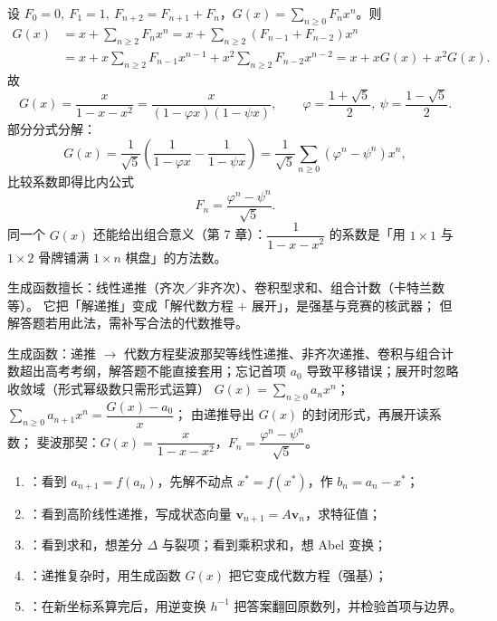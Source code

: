 \begin{explore}
设 $F_0=0,\ F_1=1,\ F_{n+2}=F_{n+1}+F_n$，$G(x)=\sum_{n\ge0}F_nx^n$。则
\[
\begin{aligned}
  G(x)&=x+\sum_{n\ge2}F_nx^n
  =x+\sum_{n\ge2}(F_{n-1}+F_{n-2})x^n\\
  &=x+x\sum_{n\ge2}F_{n-1}x^{n-1}+x^2\sum_{n\ge2}F_{n-2}x^{n-2}
  =x+xG(x)+x^2G(x) .
\end{aligned}
\]
故
\[
  G(x)=\frac{x}{1-x-x^2}
  =\frac{x}{(1-\varphi x)(1-\psi x)},\qquad
  \varphi=\frac{1+\sqrt5}{2},\ \psi=\frac{1-\sqrt5}{2} .
\]
部分分式分解：
\[
  G(x)=\frac1{\sqrt5}\left(\frac1{1-\varphi x}-\frac1{1-\psi x}\right)
  =\frac1{\sqrt5}\sum_{n\ge0}(\varphi^n-\psi^n)x^n ,
\]
比较系数即得比内公式
\[
  F_n=\frac{\varphi^n-\psi^n}{\sqrt5} .
\]
同一个 $G(x)$ 还能给出组合意义（第 7 章）：$\dfrac1{1-x-x^2}$ 的系数是「用 $1\times1$ 与 $1\times2$ 骨牌铺满 $1\times n$ 棋盘」的方法数。

生成函数擅长：线性递推（齐次／非齐次）、卷积型求和、组合计数（卡特兰数等）。
它把「解递推」变成「解代数方程 $+$ 展开」，是强基与竞赛的核武器；
但解答题若用此法，需补写合法的代数推导。

\begin{conccard}[三级]{生成函数：递推 $\to$ 代数方程}{斐波那契等线性递推、非齐次递推、卷积与组合计数}{超出高考考纲，解答题不能直接套用；忘记首项 $a_0$ 导致平移错误；展开时忽略收敛域（形式幂级数只需形式运算）}
$G(x)=\sum_{n\ge0}a_nx^n$；$\sum_{n\ge0}a_{n+1}x^n=\dfrac{G(x)-a_0}{x}$；
由递推导出 $G(x)$ 的封闭形式，再展开读系数；
斐波那契：$G(x)=\dfrac{x}{1-x-x^2}$，$F_n=\dfrac{\varphi^n-\psi^n}{\sqrt5}$。
\end{conccard}

\begin{method}
\begin{enumerate}
  \item {}：看到 $a_{n+1}=f(a_n)$，先解不动点 $x^*=f(x^*)$，作 $b_n=a_n-x^*$；
  \item {}：看到高阶线性递推，写成状态向量 $\mathbf v_{n+1}=A\mathbf v_n$，求特征值；
  \item {}：看到求和，想差分 $\Delta$ 与裂项；看到乘积求和，想 Abel 变换；
  \item {}：递推复杂时，用生成函数 $G(x)$ 把它变成代数方程（强基）；
  \item {}：在新坐标系算完后，用逆变换 $h^{-1}$ 把答案翻回原数列，并检验首项与边界。
\end{enumerate}
\end{method}


\end{explore}
